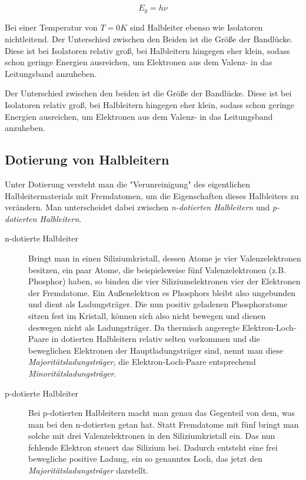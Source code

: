 \documentclass[slug=SZ, room=Hermann-Krone-Bau\,\ Labor\ 1.25,
supervisor=Martin\ Kroll, coursedate=14.\ 11.\ 2019]{../../Lab_Report_LaTeX/lab_report}
\begin{document}
\begin{equation}\label{eq:bandenenergie}
        E_g = h\nu
\end{equation}

Bei einer Temperatur von \(T=0 K\) sind Halbleiter ebenso wie Isolatoren nichtleitend.
Der Unterschied zwischen den Beiden ist die Größe der Bandlücke. Diese ist bei Isolatoren relativ groß,
bei Halbleitern hingegen eher klein, sodass schon geringe Energien ausreichen, um Elektronen aus dem Valenz-
in das Leitungsband anzuheben.

Der Unterschied zwischen den beiden ist die Größe der Bandlücke. Diese ist bei Isolatoren relativ groß,
bei Halbleitern hingegen eher klein, sodass schon geringe Energien ausreichen, um Elektronen aus dem Valenz-
in das Leitungsband anzuheben.

\subsection{Dotierung von Halbleitern}
\label{sec:dotierung}

Unter Dotierung versteht man die "Verunreinigung" des eigentlichen Halbleitermaterials mit Fremdatomen, um
die Eigenschaften dieses Halbleiters zu verändern.
Man unterscheidet dabei zwischen \emph{n-dotierten Halbleitern} und \emph{p-dotierten Halbleitern}.

\begin{description}

        \item[n-dotierte Halbleiter]
        Bringt man in einen Siliziumkristall, dessen Atome je vier Valenzelektronen
        besitzen, ein paar Atome, die beispielsweise fünf Valenzelektronen (z.B. Phosphor) haben, so binden die
        vier Siliziumelektronen vier der Elektronen der Fremdatome. Ein Außenelektron es Phosphors bleibt also
        ungebunden und dient als Ladungsträger. Die nun positiv geladenen Phosphoratome sitzen fest im Kristall,
        können sich also nicht bewegen und dienen deswegen nicht als Ladungsträger.
        Da thermisch angeregte Elektron-Loch-Paare in dotierten Halbleitern relativ selten vorkommen und die
        beweglichen Elektronen der Hauptladungsträger sind, nennt man diese \emph{Majoritätsladungsträger}, die
        Elektron-Loch-Paare entsprechend \emph{Minoritätsladungsträger}.

        \item[p-dotierte Halbleiter]
        Bei p-dotierten Halbleitern macht man genau das Gegenteil von dem, was man
        bei den n-dotierten getan hat. Statt Fremdatome mit fünf bringt man solche mit drei Valenzelektronen
        in den Siliziumkristall ein. Das nun fehlende Elektron steuert das Silizium bei. Dadurch entsteht eine
        frei bewegliche positive Ladung, ein so genanntes Loch, das jetzt den \emph{Majoritätsladungsträger}
        darstellt.

\end{description}
\end{document}
